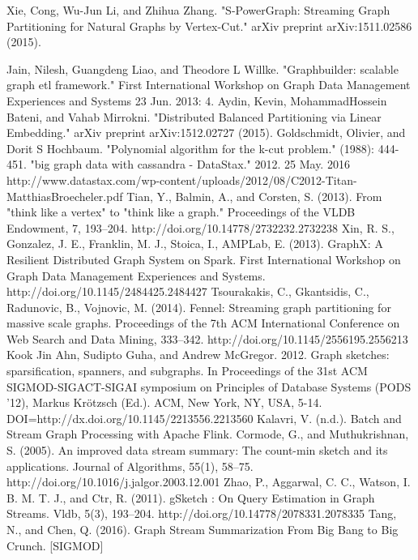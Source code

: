 \documentclass[12pt]{report}
\numberwithin{figure}{section}
\numberwithin{table}{section}
\begin{document}
\begin{thebibliography}{1}
   Xie, Cong, Wu-Jun Li, and Zhihua Zhang. "S-PowerGraph: Streaming Graph Partitioning for Natural Graphs by Vertex-Cut." arXiv preprint arXiv:1511.02586 (2015).
  
   Jain, Nilesh, Guangdeng Liao, and Theodore L Willke. "Graphbuilder: scalable graph etl framework." First International Workshop on Graph Data Management Experiences and Systems 23 Jun. 2013: 4.
   Aydin, Kevin, MohammadHossein Bateni, and Vahab Mirrokni. "Distributed Balanced Partitioning via Linear Embedding." arXiv preprint arXiv:1512.02727 (2015).
   Goldschmidt, Olivier, and Dorit S Hochbaum. "Polynomial algorithm for the k-cut problem." (1988): 444-451.
   "big graph data with cassandra - DataStax." 2012. 25 May. 2016 http://www.datastax.com/wp-content/uploads/2012/08/C2012-Titan-MatthiasBroecheler.pdf
   Tian, Y., Balmin, A., and Corsten, S. (2013). From "think like a vertex" to "think like a graph." Proceedings of the VLDB Endowment, 7, 193–204. http://doi.org/10.14778/2732232.2732238
   Xin, R. S., Gonzalez, J. E., Franklin, M. J., Stoica, I.,  AMPLab, E. (2013). GraphX: A Resilient Distributed Graph System on Spark. First International Workshop on Graph Data Management Experiences and Systems. http://doi.org/10.1145/2484425.2484427
   Tsourakakis, C., Gkantsidis, C., Radunovic, B.,  Vojnovic, M. (2014). Fennel: Streaming graph partitioning for massive scale graphs. Proceedings of the 7th ACM International Conference on Web Search and Data Mining, 333–342. http://doi.org/10.1145/2556195.2556213
  Kook Jin Ahn, Sudipto Guha, and Andrew McGregor. 2012. Graph sketches: sparsification, spanners, and subgraphs. In Proceedings of the 31st ACM SIGMOD-SIGACT-SIGAI symposium on Principles of Database Systems (PODS '12), Markus Krötzsch (Ed.). ACM, New York, NY, USA, 5-14. DOI=http://dx.doi.org/10.1145/2213556.2213560
   Kalavri, V. (n.d.). Batch and Stream Graph Processing with Apache Flink.
   Cormode, G., and Muthukrishnan, S. (2005). An improved data stream summary: The count-min sketch and its applications. Journal of Algorithms, 55(1), 58–75. http://doi.org/10.1016/j.jalgor.2003.12.001
   Zhao, P., Aggarwal, C. C., Watson, I. B. M. T. J., and Ctr, R. (2011). gSketch : On Query Estimation in Graph Streams. Vldb, 5(3), 193–204. http://doi.org/10.14778/2078331.2078335
   Tang, N., and Chen, Q. (2016). Graph Stream Summarization From Big Bang to Big Crunch. [SIGMOD]

\end{thebibliography}
\end{document}
